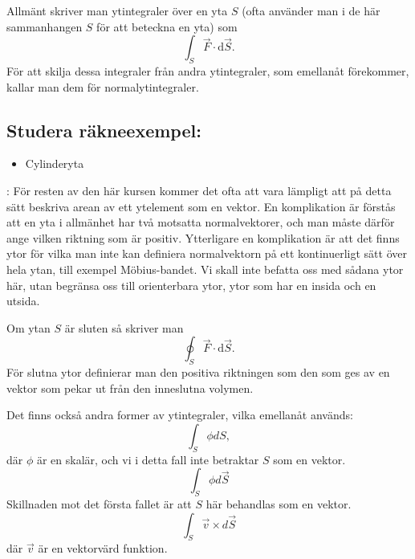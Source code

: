 \documentclass[%
oneside,                 %
final,                   %
10pt]{article}
\newcommand{\longinlinecomment}[3]{{\color{red}{\bf #1}: #2}}
\begin{document}
Allmänt skriver man ytintegraler över en yta $S$ (ofta använder man i de här sammanhangen $S$ för att beteckna en yta) som
\begin{equation}
  \int_S \vec{F} \cdot \mbox{d}\vec{S}.
\end{equation}
För att skilja dessa integraler från andra ytintegraler, som emellanåt förekommer, kallar man dem för normalytintegraler.

\subsection{Studera räkneexempel:}
\begin{itemize}
\item Cylinderyta
\end{itemize}

\noindent
\longinlinecomment{Comment 2}{ För resten av den här kursen kommer det ofta att vara lämpligt att på detta sätt beskriva arean av ett ytelement som en vektor.  En komplikation är förstås att en yta i allmänhet har två motsatta normalvektorer, och man måste därför ange vilken riktning som är positiv. Ytterligare en komplikation är att det finns ytor för vilka man inte kan definiera normalvektorn på ett kontinuerligt sätt över hela ytan, till exempel Möbius-bandet.  Vi skall inte befatta oss med sådana ytor här, utan begränsa oss till orienterbara ytor, ytor som har en insida och en utsida. }{ För resten av den }

Om ytan $S$ är sluten så skriver man
\begin{equation}
  \oint_S \vec{F} \cdot \mbox{d}\vec{S}.
\end{equation}
För slutna ytor definierar man den positiva riktningen som den som ges av en vektor som pekar ut från den inneslutna volymen.

Det finns också andra former av ytintegraler, vilka emellanåt används:
\begin{equation}
  \int_S \phi dS,
\end{equation}
där $\phi$ är en skalär, och vi i detta fall inte betraktar $S$ som en 
vektor.
\begin{equation}
  \int_S \phi d\vec{S}
\end{equation}
Skillnaden mot det första fallet är att $S$ här behandlas som en vektor.
\begin{equation}
  \int_S \vec{v} \times d\vec{S}
\end{equation}
där $\vec{v}$ är en vektorvärd funktion.
\end{document}
